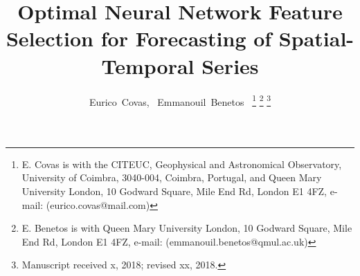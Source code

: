 \documentclass[journal]{IEEEtran}
\begin{document}
%
\title{Optimal Neural Network Feature Selection for Forecasting of Spatial-Temporal Series}
%
%
%



\author{Eurico~Covas,~\IEEEmembership{}
	    Emmanouil~Benetos~\IEEEmembership{}%
\thanks{E. Covas is with the CITEUC, Geophysical and Astronomical Observatory, University of Coimbra, 3040-004, Coimbra, Portugal, and
Queen Mary University London, 10 Godward Square, Mile End Rd, London E1 4FZ,  e-mail: (eurico.covas@mail.com)}%
\thanks{E. Benetos is with Queen Mary University London, 10 Godward Square, Mile End Rd, London E1 4FZ,
e-mail: (emmanouil.benetos@qmul.ac.uk)}%
\thanks{Manuscript received x, 2018; revised xx, 2018.}}

%
%
\end{document}
